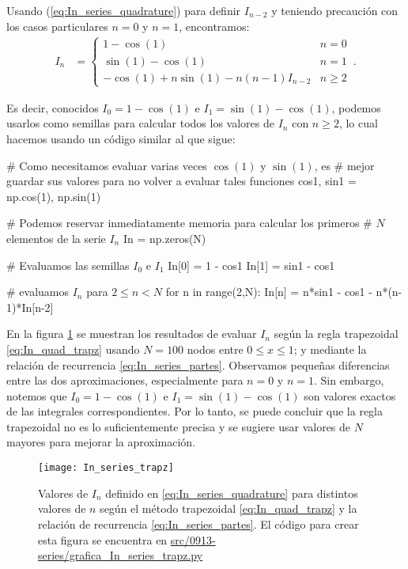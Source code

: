 \documentclass[../portafolio.tex]{subfiles}
\begin{document}
Usando (\ref{eq:In_series_quadrature}) para definir $I_{n-2}$ y
teniendo precaución con los casos particulares $n=0$ y $n=1$,
encontramos:
\begin{align}
  \label{eq:In_series_partes}
  I_n
  &=
    \begin{cases}
      1 -\cos(1) & n=0  \\
      \sin(1)-\cos(1) & n=1 \\
    -\cos(1) + n \sin(1) - n (n-1) I_{n-2} & n\geq 2     
    \end{cases}
    \,.
\end{align}

Es decir, conocidos $I_0=1 -\cos(1)$ e $I_1=\sin(1)-\cos(1)$, podemos
usarlos como semillas para calcular todos los valores de $I_n$ con
$n\geq2$, lo cual hacemos usando un código similar al que sigue: 
\begin{pythoncode}
  # Como necesitamos evaluar varias veces $\cos(1)$ y $\sin(1)$, es
  # mejor guardar sus valores para no volver a evaluar tales funciones
  cos1, sin1 = np.cos(1), np.sin(1)

  # Podemos reservar inmediatamente memoria para calcular los primeros
  # $N$ elementos de la serie $I_n$
  In = np.zeros(N)
  
  # Evaluamos las semillas $I_0$ e $I_1$
  In[0] = 1 - cos1
  In[1] = sin1 - cos1
  
  # evaluamos $I_n$ para $2\leq n < N$
  for n in range(2,N):
      In[n] = n*sin1 - cos1 - n*(n-1)*In[n-2]
\end{pythoncode}


En la figura \ref{fig:In_series_trapz} se muestran los resultados de
evaluar $I_n$ según la regla trapezoidal \eqref{eq:In_quad_trapz}
usando $N=100$ nodos entre $0\leq x \leq 1$; y mediante la relación de
recurrencia \eqref{eq:In_series_partes}. Observamos pequeñas
diferencias entre las dos aproximaciones, especialmente para $n=0$ y
$n=1$. Sin embargo, notemos que $I_0=1 -\cos(1)$ e
$I_1=\sin(1)-\cos(1)$ son valores exactos de las integrales
correspondientes. Por lo tanto, se puede concluir que la regla
trapezoidal no es lo suficientemente precisa y se sugiere usar
valores de $N$ mayores para mejorar la aproximación.
\begin{figure}[ht!]
  \centering
  \texttt{[image: In\_series\_trapz]}
  \caption{Valores de $I_n$ definido en \eqref{eq:In_series_quadrature} para distintos valores de $n$ según el método trapezoidal \eqref{eq:In_quad_trapz} y la relación de recurrencia \eqref{eq:In_series_partes}. El código para crear esta figura se encuentra en \href{src/0913-series/grafica\_In\_series\_trapz.py}{src/0913-series/grafica\_In\_series\_trapz.py}}
  \label{fig:In_series_trapz}
\end{figure}
  
\end{document}
